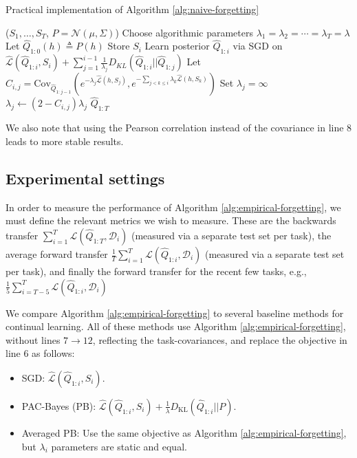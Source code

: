 \documentclass{article}
\theoremstyle{plain}
\theoremstyle{definition}
\theoremstyle{remark}
\begin{document}
\begin{algorithm}[H]
	\caption{Practical implementation of Algorithm \ref{alg:naive-forgetting}}
	\label{alg:empirical-forgetting}
	\small
	\begin{algorithmic}[1]
 ($S_1,\ldots, S_T$, $P=\mathcal{N}(\mu, \Sigma)$)
		\STATE Choose algorithmic parameters $\lambda_1 = \lambda_2 = \cdots = \lambda_T=\lambda$
		\STATE Let $\hat{Q}_{1:0}(h) \triangleq P(h)$
		\STATE Store $S_i$
            \STATE Learn posterior $\hat{Q}_{1:i}$ via SGD on $\hat{\mathcal{L}}(\hat{Q}_{1:i}, S_i)+\sum_{j=1}^{i-1}\frac{1}{\lambda_j}D_{KL}(\hat{Q}_{1:i}||\hat{Q}_{1:j})$
		\STATE Let $C_{i,j}=\textrm{Cov}_{\hat{Q}_{1:j-1}}(e^{-\lambda_j \hat{\mathcal{L}}(h,S_j)}, e^{-\sum_{j< k\leq i}\lambda_k \hat{\mathcal{L}}(h,S_k)})$
                \STATE Set $\lambda_j=\infty$ 
                    \STATE $\lambda_j \leftarrow (2-C_{i,j})\lambda_j$ 
                \ENDIF
		\ENDFOR 
		\ENDFOR
		 $\hat{Q}_{1:T}$
	\end{algorithmic}
\end{algorithm}

We also note that using the Pearson correlation instead of the covariance in line 8 leads to more stable results.

\subsection{Experimental settings}

In order to measure the performance of Algorithm \ref{alg:empirical-forgetting}, we must define the relevant metrics we wish to measure. These are the backwards transfer $\sum_{i=1}^{T}\mathcal{L}(\hat{Q}_{1:T}, \mathcal{D}_i)$ (measured via a separate test set per task), the average forward transfer $\frac{1}{T}\sum_{i=1}^{T}\mathcal{L}(\hat{Q}_{1:i}, \mathcal{D}_i)$ (measured via a separate test set per task), and finally the forward transfer for the recent few tasks, e.g., $\frac{1}{5}\sum_{i=T-5}^{T}\mathcal{L}(\hat{Q}_{1:i}, \mathcal{D}_i)$ 

We compare Algorithm \ref{alg:empirical-forgetting} to several baseline methods for continual learning. All of these methods use Algorithm \ref{alg:empirical-forgetting}, without lines $7\rightarrow 12$, reflecting the task-covariances, and replace the objective in line $6$ as follows:
\begin{itemize}
    \item SGD: $\hat{\mathcal{L}}(\hat{Q}_{1:i}, S_i)$.
    \item PAC-Bayes (PB):  $\hat{\mathcal{L}}(\hat{Q}_{1:i}, S_i)+\frac{1}{\lambda}D_{\mathrm{KL}}(\hat{Q}_{1:i}||P)$.
    \item Averaged PB: Use the same objective as Algorithm \ref{alg:empirical-forgetting}, but  $\lambda_i$ parameters are static and equal.
\end{itemize}
\end{document}
